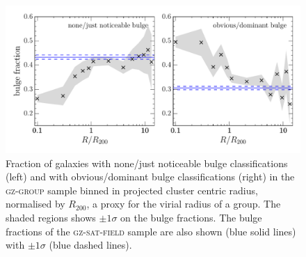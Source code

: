 \begin{figure}
\label{fig:mergerradius}
\end{figure}

\begin{figure}
\includegraphics[width=\textwidth]{environment/min_max_bulge_fraction_trend_with_log_radius_sat_field_cand.pdf}
\caption[GZ2 bulge fractions of satellite disc galaxies with projected cluster centric radius]{Fraction of galaxies with none/just noticeable bulge classifications (left) and with obvious/dominant bulge classifications (right) in the \textsc{gz-group} sample binned in projected cluster centric radius, normalised by $R_{200}$, a proxy for the virial radius of a group. The shaded regions shows $\pm1\sigma$ on the bulge fractions. The bulge fractions of the \textsc{gz-sat-field} sample are also shown (blue solid lines) with $\pm1\sigma$ (blue dashed lines).}
\label{fig:bulgeradius}
\end{figure}

